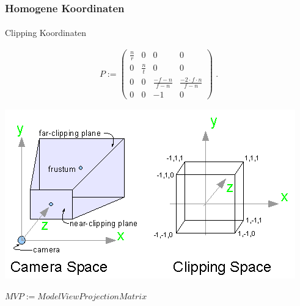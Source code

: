 \documentclass{beamer}
\begin{document}
\begin{frame}
    \frametitle{Homogene Koordinaten}
\framesubtitle{}
\begin{block}{Clipping Koordinaten}

\begin{align*}
P := \begin{pmatrix}  
\frac{n}{r}  &  0 & 0  & 0  \\
0   &  \frac{n}{t} & 0 & 0  \\
0   &  0 & \frac{-f-n}{f-n} & \frac{-2\cdot f \cdot n}{f-n}  \\
0   &  0 & -1 & 0  
\end{pmatrix}  \; .
\end{align*} 

\begin{center}
\includegraphics[scale=0.40]{images/projection}
\end{center}
$MVP := Model View Projection Matrix$

\end{block}
\end{frame}
\end{document}
